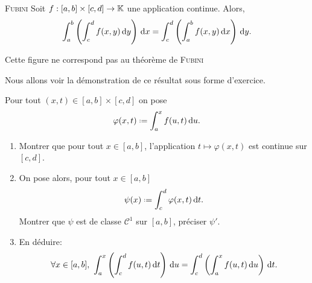 
\begin{theo}{\textsc{Fubini}}
    Soit $f: [a,b] \times [c, d] \to \mathbb{K}$ une application continue. Alors,
    $$\int_{a}^{b} \left ( \int_{c}^{d} f(x,y) \, \mathrm{d} y \right) \, \mathrm{d} x = \int_{c}^{d} \left ( \int_{a}^{b} f(x,y) \, \mathrm{d} x \right) \, \mathrm{d} y.$$
\end{theo}

\begin{marginfigure}[5cm]
    \centering
    
    \caption*{\centering Cette figure ne correspond pas au théorème de \textsc{Fubini}}
\end{marginfigure}

Nous allons voir la démonstration de ce résultat sous forme d'exercice.

\begin{exercice}
    Pour tout $(x, t) \in [a, b] \times [c, d]$ on pose 
    $$\varphi(x, t) \defeq \int_{a}^{x} f(u, t) \d u.$$
    \begin{enumerate}
        \item Montrer que pour tout $x \in [a, b]$, l'application $t \mapsto \varphi(x, t)$ est continue sur $[c, d]$.
        \item On pose alors, pour tout $x  \in [a, b]$ 
        $$\psi(x) \defeq \int_{c}^{d} \varphi(x, t) \d t.$$
        Montrer que $\psi$ est de classe $\mathscr{C}^1$ sur $[a, b]$, préciser $\psi'$.
        \item En déduire:
        $$\forall x \in [a, b],\ \int_{a}^{x} \left ( \int_{c}^{d} f(u,t) \d t \right) \d u = \int_{c}^{d} \left ( \int_{a}^{x} f(u,t) \d u \right) \d t.$$
    \end{enumerate}
\end{exercice}

